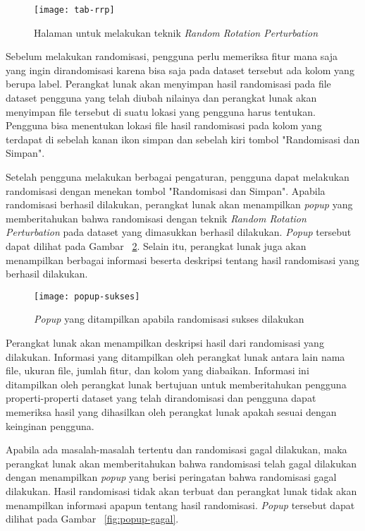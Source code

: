 \begin{figure}
	\centering
	\texttt{[image: tab-rrp]}
	\caption{Halaman untuk melakukan teknik \textit{Random Rotation Perturbation}}
	\label{fig:tab-rrp}
\end{figure}

Sebelum melakukan randomisasi, pengguna perlu memeriksa fitur mana saja yang ingin dirandomisasi karena bisa saja pada dataset tersebut ada kolom yang berupa label. Perangkat lunak akan menyimpan hasil randomisasi pada file dataset pengguna yang telah diubah nilainya dan perangkat lunak akan menyimpan file tersebut di suatu lokasi yang pengguna harus tentukan. Pengguna bisa menentukan lokasi file hasil randomisasi pada kolom yang terdapat di sebelah kanan ikon simpan dan sebelah kiri tombol "Randomisasi dan Simpan".

Setelah pengguna melakukan berbagai pengaturan, pengguna dapat melakukan randomisasi dengan menekan tombol "Randomisasi dan Simpan". Apabila randomisasi berhasil dilakukan, perangkat lunak akan menampilkan \textit{popup} yang memberitahukan bahwa randomisasi dengan teknik \textit{Random Rotation Perturbation} pada dataset yang dimasukkan berhasil dilakukan. \textit{Popup} tersebut dapat dilihat pada Gambar ~\ref{fig:popup-sukses}. Selain itu, perangkat lunak juga akan menampilkan berbagai informasi beserta deskripsi tentang hasil randomisasi yang berhasil dilakukan.

\begin{figure}
	\centering
	\texttt{[image: popup-sukses]}
	\caption{\textit{Popup} yang ditampilkan apabila randomisasi sukses dilakukan}
	\label{fig:popup-sukses}
\end{figure}

Perangkat lunak akan menampilkan deskripsi hasil dari randomisasi yang dilakukan. Informasi yang ditampilkan oleh perangkat lunak antara lain nama file, ukuran file, jumlah fitur, dan kolom yang diabaikan. Informasi ini ditampilkan oleh perangkat lunak bertujuan untuk memberitahukan pengguna properti-properti dataset yang telah dirandomisasi dan pengguna dapat memeriksa hasil yang dihasilkan oleh perangkat lunak apakah sesuai dengan keinginan pengguna.

Apabila ada masalah-masalah tertentu dan randomisasi gagal dilakukan, maka perangkat lunak akan memberitahukan bahwa randomisasi telah gagal dilakukan dengan menampilkan \textit{popup} yang berisi peringatan bahwa randomisasi gagal dilakukan. Hasil randomisasi tidak akan terbuat dan perangkat lunak tidak akan menampilkan informasi apapun tentang hasil randomisasi. \textit{Popup} tersebut dapat dilihat pada Gambar ~\ref{fig:popup-gagal}.

